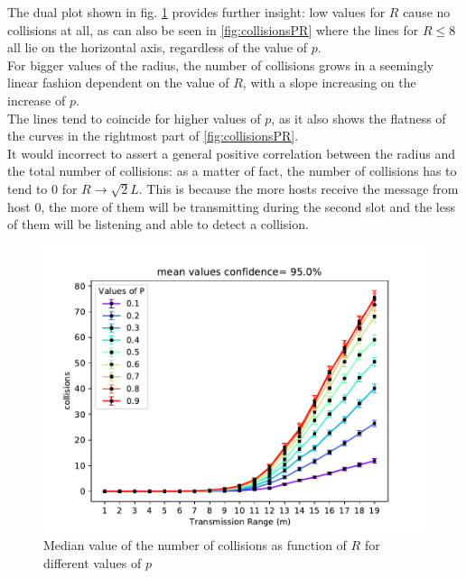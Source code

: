 The dual plot shown in fig. \ref{fig:collisionsRP} provides further insight: low values for $R$ cause no collisions at all, as can also be seen in \ref{fig:collisionsPR} where the lines for $R \leq 8$ all lie on the horizontal axis, regardless of the value of $p$.\\
For bigger values of the radius, the number of collisions grows in a seemingly linear fashion dependent on the value of $R$, with a slope increasing on the increase of $p$.\\
The lines tend to coincide for higher values of $p$, as it also shows the flatness of the curves in the rightmost part of \ref{fig:collisionsPR}.\\
It would incorrect to assert a general positive correlation between the radius and the total number of collisions: as a matter of fact, the number of collisions has to tend to 0 for $R \to \sqrt{2}L$. This is because the more hosts receive the message from host 0, the more of them will be transmitting during the second slot and the less of them will be listening and able to detect a collision.
\begin{figure}[H]
    \begin{center}
        \includegraphics[scale=.65,trim={0 0 0 0.8cm},clip]{img/big_collisions_r_mean_95.0.pdf}
    \end{center}
    \vspace*{-0.5cm}
    \caption{Median value of the number of collisions as function of $R$ for different values of $p$}
    \label{fig:collisionsRP}
\end{figure}
